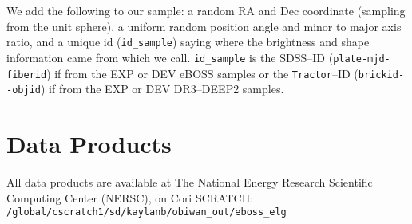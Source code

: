 \documentclass[a4paper,fleqn,usenatbib]{mnras}
\newcommand{\tractor}{{\tt Tractor}}
\begin{document}
We add the following to our sample: a random RA and Dec coordinate (sampling from the unit sphere), a uniform random position angle and minor to major axis ratio, and a unique id (\verb|id_sample|) saying where the brightness and shape information came from which we call. \verb|id_sample| is the SDSS--ID (\verb|plate-mjd-fiberid|) if from the EXP or DEV eBOSS samples or the \tractor--ID (\verb|brickid--objid|) if from the  EXP or DEV DR3--DEEP2 samples. 


\section{Data Products}
\label{sec:data-products}

All data products are available at The National Energy Research Scientific Computing Center (NERSC), on Cori SCRATCH: \verb|/global/cscratch1/sd/kaylanb/obiwan_out/eboss_elg|




\bsp	%
\label{lastpage}
\end{document}
